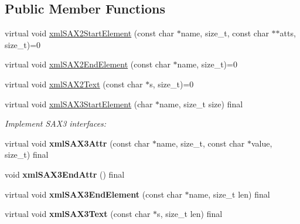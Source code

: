 \subsection*{Public Member Functions}
\begin{DoxyCompactItemize}
\item 
virtual void \hyperlink{classrapidxml_1_1xml__sax2__handler_afd825cb872693671d8dd4a6cd44f73c6}{xml\+S\+A\+X2\+Start\+Element} (const char $\ast$name, size\+\_\+t, const char $\ast$$\ast$atts, size\+\_\+t)=0
\item 
virtual void \hyperlink{classrapidxml_1_1xml__sax2__handler_a330a65a04e36574c97f458e77ed42771}{xml\+S\+A\+X2\+End\+Element} (const char $\ast$name, size\+\_\+t)=0
\item 
virtual void \hyperlink{classrapidxml_1_1xml__sax2__handler_a184f17acd823b4947f7cd4cfe4e89ae4}{xml\+S\+A\+X2\+Text} (const char $\ast$s, size\+\_\+t)=0
\item 
\mbox{\label{classrapidxml_1_1xml__sax2__handler_a9030a32652509bcc49c380c19cd95075}} 
virtual void \hyperlink{classrapidxml_1_1xml__sax2__handler_a9030a32652509bcc49c380c19cd95075}{xml\+S\+A\+X3\+Start\+Element} (char $\ast$name, size\+\_\+t size) final
\begin{DoxyCompactList}\small\item\em Implement S\+A\+X3 interfaces\+: \end{DoxyCompactList}\item 
\mbox{\label{classrapidxml_1_1xml__sax2__handler_a039f984e2dc4066357c369d4c77b7c89}} 
virtual void {\bfseries xml\+S\+A\+X3\+Attr} (const char $\ast$name, size\+\_\+t, const char $\ast$value, size\+\_\+t) final
\item 
\mbox{\label{classrapidxml_1_1xml__sax2__handler_a1a563e9fa506e91c97b7b6c79491fa6c}} 
void {\bfseries xml\+S\+A\+X3\+End\+Attr} () final
\item 
\mbox{\label{classrapidxml_1_1xml__sax2__handler_aaf6548aa663dcff39815e201a18b2338}} 
virtual void {\bfseries xml\+S\+A\+X3\+End\+Element} (const char $\ast$name, size\+\_\+t len) final
\item 
\mbox{\label{classrapidxml_1_1xml__sax2__handler_a6fb15679e02d2ddc25189d23d74c91a1}} 
virtual void {\bfseries xml\+S\+A\+X3\+Text} (const char $\ast$s, size\+\_\+t len) final
\end{DoxyCompactItemize}


